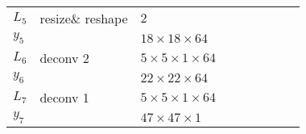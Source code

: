 \begin{table}[h!]
{\begin{tabular}{|lllllllll|}
\multicolumn{1}{|l|}{$L_5$}   & resize\& reshape & \multicolumn{1}{l|}{$2$}                    &          & \multicolumn{1}{l|}{}        \\
\multicolumn{1}{|l|}{$y_5$}   &          & \multicolumn{1}{l|}{$18\times18\times 64$}          &          & \multicolumn{1}{l|}{}        \\ \hline

\multicolumn{1}{|l|}{$L_6$}   & deconv 2   & \multicolumn{1}{l|}{$5\times 5\times1\times 64$}    &          & \multicolumn{1}{l|}{}\\
\multicolumn{1}{|l|}{$y_6$}   &          & \multicolumn{1}{l|}{$22\times22\times64$}           &          & \multicolumn{1}{l|}{}        \\ \hline


\multicolumn{1}{|l|}{$L_7$}   & deconv 1   & \multicolumn{1}{l|}{$5\times 5\times1\times 64$}    &          & \multicolumn{1}{l|}{}\\
\multicolumn{1}{|l|}{$y_7$}   &          & \multicolumn{1}{l|}{$47\times47\times1$}           &          & \multicolumn{1}{l|}{}        \\ \hline
\end{tabular}
\caption{} \label{net:2}
}
\end{table}

